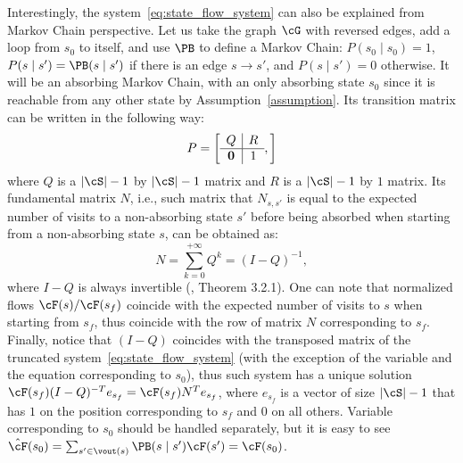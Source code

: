 Interestingly, the system~\eqref{eq:state_flow_system} can also be explained from Markov Chain perspective. Let us take the graph $\cG$ with reversed edges, add a loop from $s_0$ to itself, and use $\PB$ to define a Markov Chain: $P(s_0 \mid s_0) = 1$, $P(s \mid s') = \PB(s \mid s')$ if there is an edge $s \to s'$, and $P(s \mid s') = 0$ otherwise. It will be an absorbing Markov Chain, with an only absorbing state $s_0$ since it is reachable from any other state by Assumption~\ref{assumption}. Its transition matrix can be written in the following way:
\[P = \left[\begin{array}{ c | c }
    Q & R \\
    \hline
    \mathbf{0} & 1
  \end{array},\right]\]
where $Q$ is a $|\cS| - 1$ by $|\cS| - 1$ matrix and $R$ is a $|\cS| - 1$ by $1$ matrix. Its fundamental matrix $N$, i.e., such matrix that $N_{s, s'}$ is equal to the expected number of visits to a non-absorbing state $s'$ before being absorbed when starting from a non-absorbing state $s$, can be obtained as:
$$
N = \sum_{k=0}^{+\infty}Q^k = (I - Q)^{-1},
$$
where $I - Q$ is always invertible (\citealp{kemeny1969finite}, Theorem 3.2.1). One can note that normalized flows $\cF(s)/\cF(s_f)$ coincide with the expected number of visits to $s$ when starting from $s_f$, thus coincide with the row of matrix $N$ corresponding to $s_f$. Finally, notice that $(I - Q)$ coincides with the transposed matrix of the truncated system~\eqref{eq:state_flow_system} (with the exception of the variable and the equation corresponding to $s_0$), thus such system has a unique solution $\cF(s_f)(I - Q)^{-T} e_{s_f} = \cF(s_f)N^{T} e_{s_f}$, where $e_{s_f}$ is a vector of size $|\cS| - 1$ that has $1$ on the position corresponding to $s_f$ and $0$ on all others. Variable corresponding to $s_0$ should be handled separately, but it is easy to see $\hat{\cF}(s_0) = \sum_{s' \in \vout(s)} \PB(s \mid s'){\cF}(s') = \cF(s_0)$.


